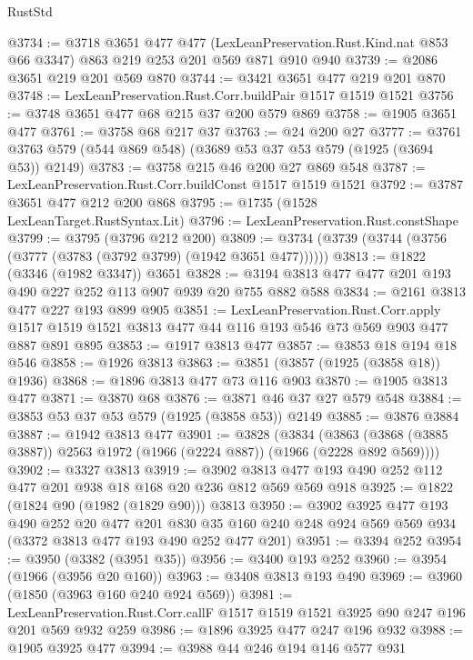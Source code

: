 \begin{lexlean}{RustStd}
\begin{coremodule}
@3734 := @3718
    @3651
    @477
    @477
    (LexLeanPreservation.Rust.Kind.nat @853 @66 @3347)
    @863
    @219
    @253
    @201
    @569
    @871
    @910
    @940
@3739 := @2086 @3651 @219 @201 @569 @870
@3744 := @3421 @3651 @477 @219 @201 @870
@3748 := LexLeanPreservation.Rust.Corr.buildPair @1517 @1519 @1521
@3756 := @3748 @3651 @477 @68 @215 @37 @200 @579 @869
@3758 := @1905 @3651 @477
@3761 := @3758 @68 @217 @37
@3763 := @24 @200 @27
@3777 := @3761 @3763 @579 (@544 @869 @548) (@3689 @53 @37 @53 @579 (@1925 (@3694 @53)) @2149)
@3783 := @3758 @215 @46 @200 @27 @869 @548
@3787 := LexLeanPreservation.Rust.Corr.buildConst @1517 @1519 @1521
@3792 := @3787 @3651 @477 @212 @200 @868
@3795 := @1735 (@1528 LexLeanTarget.RustSyntax.Lit)
@3796 := LexLeanPreservation.Rust.constShape
@3799 := @3795 (@3796 @212 @200)
@3809 := @3734 (@3739 (@3744 (@3756 (@3777 (@3783 (@3792 @3799) (@1942 @3651 @477))))))
@3813 := @1822 (@3346 (@1982 @3347)) @3651
@3828 := @3194 @3813 @477 @477 @201 @193 @490 @227 @252 @113 @907 @939 @20 @755 @882 @588
@3834 := @2161 @3813 @477 @227 @193 @899 @905
@3851 := LexLeanPreservation.Rust.Corr.apply
    @1517
    @1519
    @1521
    @3813
    @477
    @44
    @116
    @193
    @546
    @73
    @569
    @903
    @477
    @887
    @891
    @895
@3853 := @1917 @3813 @477
@3857 := @3853 @18 @194 @18 @546
@3858 := @1926 @3813
@3863 := @3851 (@3857 (@1925 (@3858 @18)) @1936)
@3868 := @1896 @3813 @477 @73 @116 @903
@3870 := @1905 @3813 @477
@3871 := @3870 @68
@3876 := @3871 @46 @37 @27 @579 @548
@3884 := @3853 @53 @37 @53 @579 (@1925 (@3858 @53)) @2149
@3885 := @3876 @3884
@3887 := @1942 @3813 @477
@3901 := @3828
    (@3834 (@3863 (@3868 (@3885 @3887)) @2563 @1972 (@1966 (@2224 @887)) (@1966 (@2228 @892 @569))))
@3902 := @3327 @3813
@3919 := @3902 @3813 @477 @193 @490 @252 @112 @477 @201 @938 @18 @168 @20 @236 @812 @569 @569 @918
@3925 := @1822 (@1824 @90 (@1982 (@1829 @90))) @3813
@3950 := @3902
    @3925
    @477
    @193
    @490
    @252
    @20
    @477
    @201
    @830
    @35
    @160
    @240
    @248
    @924
    @569
    @569
    @934
    (@3372 @3813 @477 @193 @490 @252 @477 @201)
@3951 := @3394 @252
@3954 := @3950 (@3382 (@3951 @35))
@3956 := @3400 @193 @252
@3960 := @3954 (@1966 (@3956 @20 @160))
@3963 := @3408 @3813 @193 @490
@3969 := @3960 (@1850 (@3963 @160 @240 @924 @569))
@3981 := LexLeanPreservation.Rust.Corr.callF
    @1517
    @1519
    @1521
    @3925
    @90
    @247
    @196
    @201
    @569
    @932
    @259
@3986 := @1896 @3925 @477 @247 @196 @932
@3988 := @1905 @3925 @477
@3994 := @3988 @44 @246 @194 @146 @577 @931

\end{coremodule}
\end{lexlean}
